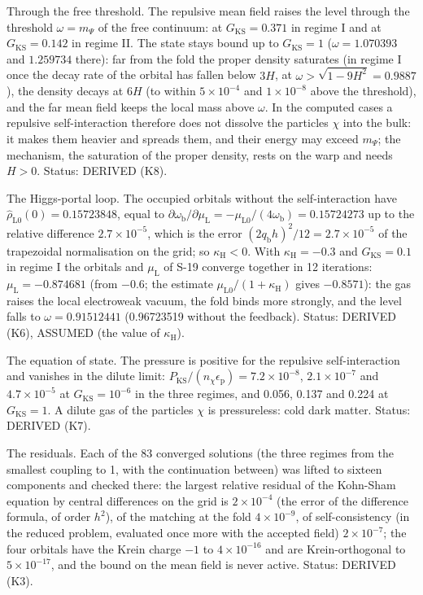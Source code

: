 \documentclass[
  10pt,
]{article}
\begin{document}
Through the free threshold. The repulsive mean field raises the level
through the threshold \(\omega = m_\Psi\) of the free continuum: at
\(G_{\mathrm{KS}} = 0.371\) in regime I and at
\(G_{\mathrm{KS}} = 0.142\) in regime II. The state stays bound up to
\(G_{\mathrm{KS}} = 1\) (\(\omega = 1.070393\) and \(1.259734\) there):
far from the fold the proper density saturates (in regime I once the
decay rate of the orbital has fallen below \(3H\), at
\(\omega > \sqrt{1 - 9H^2} = 0.9887\)), the density decays at \(6H\) (to
within \(5\times10^{-4}\) and \(1\times10^{-8}\) above the threshold),
and the far mean field keeps the local mass above \(\omega\). In the
computed cases a repulsive self-interaction therefore does not dissolve
the particles \(\chi\) into the bulk: it makes them heavier and spreads
them, and their energy may exceed \(m_\Psi\); the mechanism, the
saturation of the proper density, rests on the warp and needs \(H > 0\).
Status: DERIVED (K8).

The Higgs-portal loop. The occupied orbitals without the
self-interaction have \(\hat\rho_{\mathrm{L}0}(0) = 0.15723848\), equal
to
\(\partial\omega_{\mathrm{b}}/\partial\mu_{\mathrm{L}} = -\mu_{\mathrm{L}0}/(4\omega_{\mathrm{b}}) = 0.15724273\)
up to the relative difference \(2.7\times10^{-5}\), which is the error
\((2q_{\mathrm{b}}h)^2/12 = 2.7\times10^{-5}\) of the trapezoidal
normalisation on the grid; so \(\kappa_{\mathrm{H}} < 0\). With
\(\kappa_{\mathrm{H}} = -0.3\) and \(G_{\mathrm{KS}} = 0.1\) in regime I
the orbitals and \(\mu_{\mathrm{L}}\) of S-19 converge together in 12
iterations: \(\mu_{\mathrm{L}} = -0.874681\) (from \(-0.6\); the
estimate \(\mu_{\mathrm{L}0}/(1 + \kappa_{\mathrm{H}})\) gives
\(-0.8571\)): the gas raises the local electroweak vacuum, the fold
binds more strongly, and the level falls to \(\omega = 0.91512441\)
(0.96723519 without the feedback). Status: DERIVED (K6), ASSUMED (the
value of \(\kappa_{\mathrm{H}}\)).

The equation of state. The pressure is positive for the repulsive
self-interaction and vanishes in the dilute limit:
\(P_{\mathrm{KS}}/(n_\chi\epsilon_{\mathrm{p}}) = 7.2\times10^{-8}\),
\(2.1\times10^{-7}\) and \(4.7\times10^{-5}\) at
\(G_{\mathrm{KS}} = 10^{-6}\) in the three regimes, and 0.056, 0.137 and
0.224 at \(G_{\mathrm{KS}} = 1\). A dilute gas of the particles \(\chi\)
is pressureless: cold dark matter. Status: DERIVED (K7).

The residuals. Each of the 83 converged solutions (the three regimes
from the smallest coupling to 1, with the continuation between) was
lifted to sixteen components and checked there: the largest relative
residual of the Kohn-Sham equation by central differences on the grid is
\(2\times10^{-4}\) (the error of the difference formula, of order
\(h^2\)), of the matching at the fold \(4\times10^{-9}\), of
self-consistency (in the reduced problem, evaluated once more with the
accepted field) \(2\times10^{-7}\); the four orbitals have the Krein
charge \(-1\) to \(4\times10^{-16}\) and are Krein-orthogonal to
\(5\times10^{-17}\), and the bound on the mean field is never active.
Status: DERIVED (K3).
\end{document}
